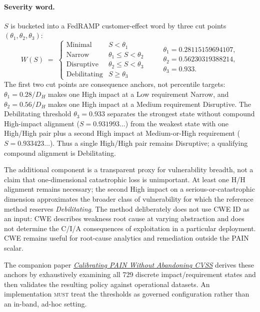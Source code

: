 \documentclass[11pt]{article}
\newcommand{\rfckw}[1]{\textsc{#1}}
\begin{document}
\paragraph{Severity word.}
\label{sec:thresholds}
$S$ is bucketed into a FedRAMP customer-effect word by three cut points
$(\theta_1,\theta_2,\theta_3)$:
\begin{equation}
W(S) \;=\;
\begin{cases}
\text{Minimal} & S < \theta_1 \\
\text{Narrow} & \theta_1 \le S < \theta_2 \\
\text{Disruptive} & \theta_2 \le S < \theta_3 \\
\text{Debilitating} & S \ge \theta_3
\end{cases}
\qquad
\begin{gathered}
\theta_1=0.28115159694107,\\
\theta_2=0.56230319388214,\\
\theta_3=0.933.
\end{gathered}
\label{eq:word}
\end{equation}
The first two cut points are consequence anchors, not percentile targets:
$\theta_1=0.28/D_H$ makes one High impact at a Low requirement Narrow, and
$\theta_2=0.56/D_H$ makes one High impact at a Medium requirement Disruptive.
The Debilitating threshold $\theta_3=0.933$ separates the strongest state without
compound High-impact alignment ($S=0.931993\ldots$) from the weakest state with
one High/High pair plus a second High impact at Medium-or-High requirement
($S=0.933423\ldots$). Thus a single High/High pair remains Disruptive; a qualifying
compound alignment is Debilitating.

The additional component is a transparent proxy for vulnerability breadth, not a
claim that one-dimensional catastrophic loss is unimportant. At least one H/H
alignment remains necessary; the second High impact on a serious-or-catastrophic
dimension approximates the broader class of vulnerability for which the reference
method reserves \emph{Debilitating}. The method deliberately does not use CWE ID as
an input: CWE describes weakness root cause at varying abstraction and does not
determine the C/I/A consequences of exploitation in a particular deployment.
CWE remains useful for root-cause analytics and remediation outside the PAIN
scalar.

The companion paper
\href{https://stackarmor.github.io/rfc-fedramp-vdr/vdr-pain-calibration.pdf}
{\emph{Calibrating PAIN Without Abandoning CVSS}} derives these anchors by
exhaustively examining all 729 discrete impact/requirement states and then validates
the resulting policy against operational datasets. An
implementation \rfckw{must} treat the thresholds as governed configuration rather
than an in-band, ad-hoc setting.
\end{document}
